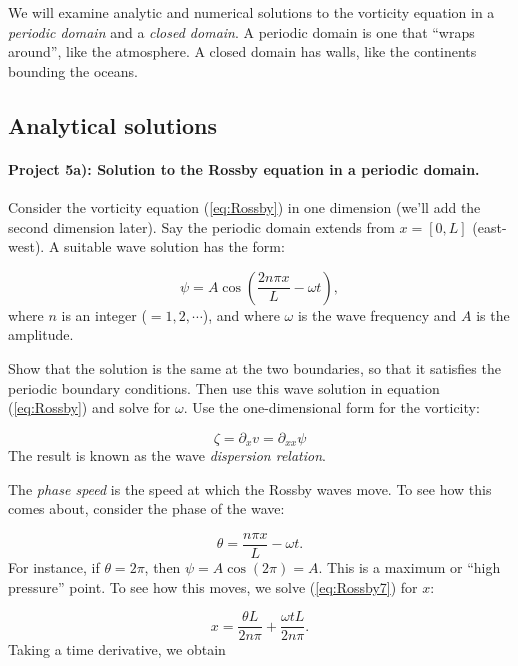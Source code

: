 \documentclass[%
oneside,                 %
final,                   %
10pt]{article}
\begin{document}
We will examine analytic and numerical solutions to the vorticity
equation in a \emph{periodic domain} and a \emph{closed domain}. A
periodic domain is one that ``wraps around'', like the atmosphere. A
closed domain has walls, like the continents bounding the oceans.

\subsection*{Analytical solutions}

\paragraph{Project 5a): Solution to the Rossby equation in a periodic domain.}
Consider the vorticity equation (\ref{eq:Rossby}) in one dimension
(we'll add the second dimension later). Say the periodic domain
extends from $x=[0,L]$ (east-west). A suitable wave solution has the
form:

\begin{equation}
  \label{eq:Rossby5}
	\psi = A \cos{(\frac{2n\pi x}{L} - \omega t)}, 
\end{equation}
where $n$ is an integer ($=1,2,\cdots$), and where $\omega$ is the
wave frequency and $A$ is the amplitude.

Show that the solution is the same at the two boundaries, so that it
satisfies the periodic boundary conditions. Then use this wave solution
in equation (\ref{eq:Rossby}) and solve for $\omega$. Use the
one-dimensional form for the vorticity:

\begin{equation}
  \label{eq:Rossby6}
	\zeta = \partial_x v = \partial_{xx} \psi
\end{equation}
The result is known as the wave \emph{dispersion relation}.

The \emph{phase speed} is the speed at which the Rossby waves move. To see how this comes about, consider the phase of the wave:

\begin{equation}
  \label{eq:Rossby7}
	\theta = \frac{n\pi x}{L} - \omega t.
\end{equation}
For instance, if $\theta=2\pi$, then $\psi = A\cos{(2\pi)} = A$. This is a maximum or ``high pressure'' point. To see how this moves, we solve (\ref{eq:Rossby7}) for $x$:

\begin{equation}
	x = \frac{\theta L}{2n\pi} + \frac{\omega tL}{2n\pi}.
\end{equation}
Taking a time derivative, we obtain
\end{document}
